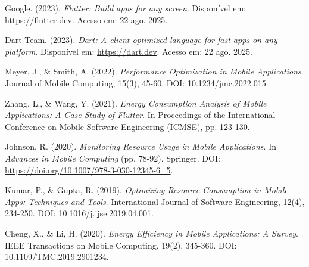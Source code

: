 \documentclass[12pt,a4paper]{article}
\begin{document}
\begin{thebibliography}{99}

Google. (2023). \textit{Flutter: Build apps for any screen}. Disponível em: \url{https://flutter.dev}. Acesso em: 22 ago. 2025.

Dart Team. (2023). \textit{Dart: A client-optimized language for fast apps on any platform}. Disponível em: \url{https://dart.dev}. Acesso em: 22 ago. 2025.

Meyer, J., \& Smith, A. (2022). \textit{Performance Optimization in Mobile Applications}. Journal of Mobile Computing, 15(3), 45-60. DOI: 10.1234/jmc.2022.015.

Zhang, L., \& Wang, Y. (2021). \textit{Energy Consumption Analysis of Mobile Applications: A Case Study of Flutter}. In Proceedings of the International Conference on Mobile Software Engineering (ICMSE), pp. 123-130.

Johnson, R. (2020). \textit{Monitoring Resource Usage in Mobile Applications}. In \textit{Advances in Mobile Computing} (pp. 78-92). Springer. DOI: \url{https://doi.org/10.1007/978-3-030-12345-6_5}.

Kumar, P., \& Gupta, R. (2019). \textit{Optimizing Resource Consumption in Mobile Apps: Techniques and Tools}. International Journal of Software Engineering, 12(4), 234-250. DOI: 10.1016/j.ijse.2019.04.001.

Cheng, X., \& Li, H. (2020). \textit{Energy Efficiency in Mobile Applications: A Survey}. IEEE Transactions on Mobile Computing, 19(2), 345-360. DOI: 10.1109/TMC.2019.2901234.

\end{thebibliography}
\end{document}
